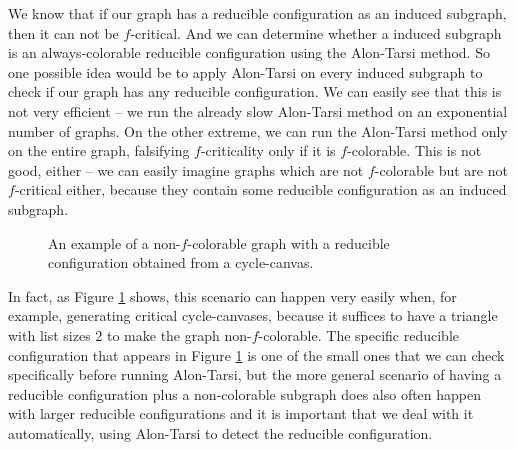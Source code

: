 We know that if our graph has a reducible configuration as an induced subgraph, then it can not
be $f$-critical. And we can determine whether a induced subgraph is an always-colorable reducible 
configuration using the Alon-Tarsi method. So one possible idea would be to apply Alon-Tarsi on 
every induced subgraph to check if our graph has any reducible configuration. We can easily see 
that this is not very efficient -- we run the already slow Alon-Tarsi method on an exponential 
number of graphs. On the other extreme, we can run the Alon-Tarsi method only on the entire 
graph, falsifying $f$-criticality only if it is $f$-colorable. This is not good, either -- we can 
easily imagine graphs which are not $f$-colorable but are not $f$-critical either, 
because they contain some reducible configuration as an induced subgraph. 


\begin{figure}

\centering
\begin{subfigure}{0.4\textwidth}
\begin{tikzpicture}[scale=0.6]

\end{tikzpicture}
\end{subfigure}
\begin{subfigure}{0.1\textwidth}
\end{subfigure}
\begin{subfigure}{0.4\textwidth}
\begin{tikzpicture}[scale=0.6, yshift=5cm]

\end{tikzpicture}
\end{subfigure}
\caption{An example of a non-$f$-colorable graph with a reducible configuration obtained from a cycle-canvas.}
\label{fig:recursivereducibility}
\end{figure}

In fact, as Figure \ref{fig:recursivereducibility} shows, this scenario can happen very easily when, 
for example, generating critical cycle-canvases, because it suffices to have a triangle with list 
sizes $2$ to make the graph non-$f$-colorable. The specific reducible configuration that appears 
in Figure \ref{fig:recursivereducibility} is one of the small ones that we can check specifically before 
running Alon-Tarsi, but the more general scenario of having a reducible configuration plus a 
non-colorable subgraph does also often happen with larger reducible configurations and it is 
important that we deal with it automatically, using Alon-Tarsi to detect the reducible 
configuration.

